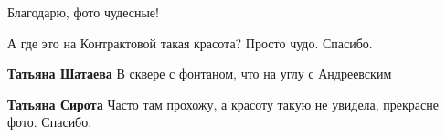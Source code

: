  
 
 
 
 


Благодарю, фото чудесные!

А где это на Контрактовой такая красота? Просто чудо. Спасибо.

\textbf{Татьяна Шатаева} В сквере с фонтаном, что на углу с Андреевским

\textbf{Татьяна Сирота} Часто там прохожу, а красоту такую не увидела, прекрасне фото. Спасибо.
